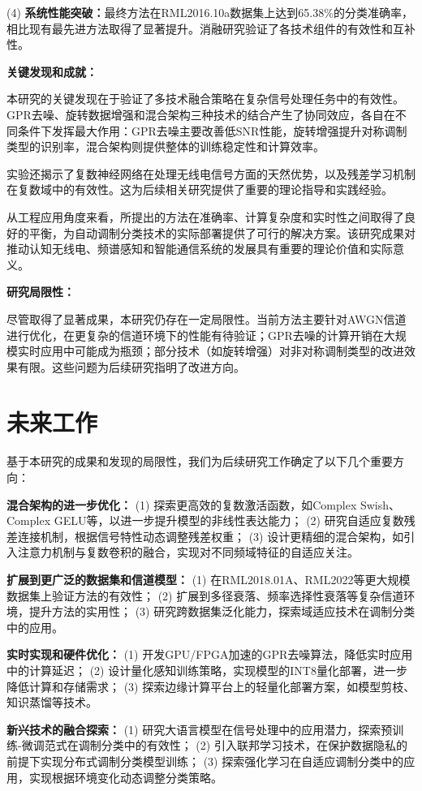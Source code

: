 \documentclass[conference]{IEEEtran}
\begin{document}
(4) \textbf{系统性能突破：}最终方法在RML2016.10a数据集上达到65.38\%的分类准确率，相比现有最先进方法取得了显著提升。消融研究验证了各技术组件的有效性和互补性。

\textbf{关键发现和成就：}

本研究的关键发现在于验证了多技术融合策略在复杂信号处理任务中的有效性。GPR去噪、旋转数据增强和混合架构三种技术的结合产生了协同效应，各自在不同条件下发挥最大作用：GPR去噪主要改善低SNR性能，旋转增强提升对称调制类型的识别率，混合架构则提供整体的训练稳定性和计算效率。

实验还揭示了复数神经网络在处理无线电信号方面的天然优势，以及残差学习机制在复数域中的有效性。这为后续相关研究提供了重要的理论指导和实践经验。

从工程应用角度来看，所提出的方法在准确率、计算复杂度和实时性之间取得了良好的平衡，为自动调制分类技术的实际部署提供了可行的解决方案。该研究成果对推动认知无线电、频谱感知和智能通信系统的发展具有重要的理论价值和实际意义。

\textbf{研究局限性：}

尽管取得了显著成果，本研究仍存在一定局限性。当前方法主要针对AWGN信道进行优化，在更复杂的信道环境下的性能有待验证；GPR去噪的计算开销在大规模实时应用中可能成为瓶颈；部分技术（如旋转增强）对非对称调制类型的改进效果有限。这些问题为后续研究指明了改进方向。

\section{未来工作}

基于本研究的成果和发现的局限性，我们为后续研究工作确定了以下几个重要方向：

\textbf{混合架构的进一步优化：}
(1) 探索更高效的复数激活函数，如Complex Swish、Complex GELU等，以进一步提升模型的非线性表达能力；
(2) 研究自适应复数残差连接机制，根据信号特性动态调整残差权重；
(3) 设计更精细的混合架构，如引入注意力机制与复数卷积的融合，实现对不同频域特征的自适应关注。

\textbf{扩展到更广泛的数据集和信道模型：}
(1) 在RML2018.01A、RML2022等更大规模数据集上验证方法的有效性；
(2) 扩展到多径衰落、频率选择性衰落等复杂信道环境，提升方法的实用性；
(3) 研究跨数据集泛化能力，探索域适应技术在调制分类中的应用。

\textbf{实时实现和硬件优化：}
(1) 开发GPU/FPGA加速的GPR去噪算法，降低实时应用中的计算延迟；
(2) 设计量化感知训练策略，实现模型的INT8量化部署，进一步降低计算和存储需求；
(3) 探索边缘计算平台上的轻量化部署方案，如模型剪枝、知识蒸馏等技术。

\textbf{新兴技术的融合探索：}
(1) 研究大语言模型在信号处理中的应用潜力，探索预训练-微调范式在调制分类中的有效性；
(2) 引入联邦学习技术，在保护数据隐私的前提下实现分布式调制分类模型训练；
(3) 探索强化学习在自适应调制分类中的应用，实现根据环境变化动态调整分类策略。
\end{document}
